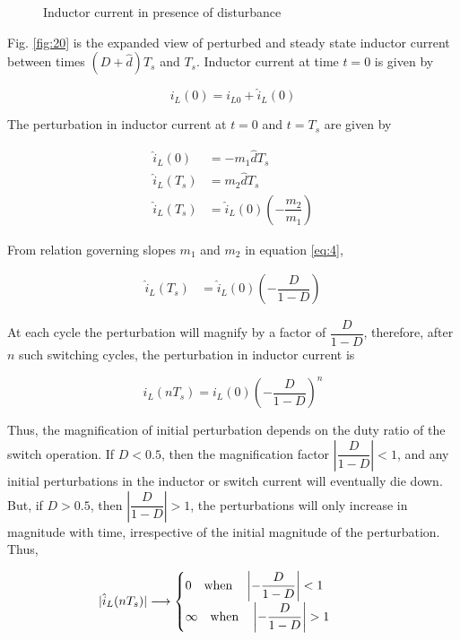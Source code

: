 \documentclass[a4paper]{IEEEtran}
\begin{document}
	\begin{figure}
		\centering
		
		\caption{Inductor current in presence of disturbance}
		\label{fig:19}
	\end{figure}

	Fig. \ref{fig:20} is the expanded view of perturbed and steady state inductor current between times $(D+\hat{d})T_s$ and $T_s$. Inductor current at time $t=0$ is given by

	\begin{equation*}
		i_L(0) = i_{L0} + \hat{i}_L(0)
	\end{equation*}

	The perturbation in inductor current at $t=0$ and $t=T_s$ are given by

	\begin{align}
		\hat{i}_L(0) &= -m_1\hat{d}T_s\\
		\hat{i}_L(T_s) &= m_2\hat{d}T_s\\
		\hat{i}_L(T_s) &= \hat{i}_L(0) \left( -\dfrac{m_2}{m_1} \right)
		\label{eq:5}
	\end{align}

	From relation governing slopes $m_1$ and $m_2$ in equation \eqref{eq:4},

	\begin{align}
		\hat{i}_L(T_s) &= \hat{i}_L(0) \left( -\dfrac{D}{1-D} \right)
		\label{eq:6}
	\end{align}

	At each cycle the perturbation will magnify by a factor of $\dfrac{D}{1-D}$, therefore, after $n$ such switching cycles, the perturbation in inductor current is

	\begin{equation}
		i_L(nT_s) = i_L(0)\left( -\dfrac{D}{1-D} \right)^n
		\label{eq:7}
	\end{equation}

	Thus, the magnification of initial perturbation depends on the duty ratio of the switch operation. If $D<0.5$, then the magnification factor $|\dfrac{D}{1-D}| < 1$, and any initial perturbations in the inductor or switch current will eventually die down. But, if $D>0.5$, then $|\dfrac{D}{1-D}| > 1$, the perturbations will only increase in magnitude with time, irrespective of the initial magnitude of the perturbation. Thus,

	\begin{align}
		|\hat{i}_L(nT_s)| \longrightarrow \left\{ 
		\parbox[]{2in}
		{$0 \quad \text{when} \quad \left|-\dfrac{D}{1-D}\right| < 1 $\\
		$\infty \quad \text{when} \quad \left|-\dfrac{D}{1-D}\right| > 1$}
		\right.
		\label{eq:8}
	\end{align}
\end{document}
